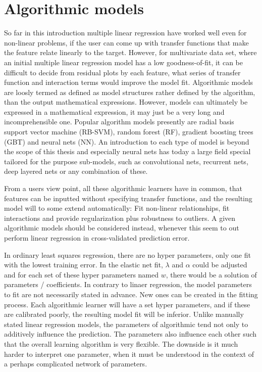\section{Algorithmic models}
So far in this introduction multiple linear regression have worked well even for non-linear problems, if the user can come up with transfer functions that make the feature relate linearly to the target. However, for multivariate data set, where an initial multiple linear regression model has a low goodness-of-fit, it can be difficult to decide from residual plots by each feature, what series of transfer function and interaction terms would improve the model fit. Algorithmic models are loosly termed as defined as model structures rather defined by the algorithm, than the output mathematical expressions. However, models can ultimately be expressed in a mathematical expression, it may just be a very long and incomprehensible one. Popular algorithm models presently are radial basis support vector machine (RB-SVM), random forest (RF), gradient boosting trees (GBT) and neural nets (NN). An introduction to each type of model is beyond the scope of this thesis and especially neural nets has today a large field special tailored for the purpose sub-models, such as convolutional nets, recurrent nets, deep layered nets or any combination of these. 

From a users view point, all these algorithmic learners have in common, that features can be inputted without specifying transfer functions, and the resulting model will to some extend automatically: Fit non-linear relationships, fit interactions and provide regularization plus robustness to outliers. A given algorithmic models should be considered instead, whenever this seem to out perform linear regression in cross-validated prediction error.

In ordinary least squares regression, there are no hyper parameters, only one fit with the lowest training error. In the elastic net fit, $\lambda$ and $\alpha$ could be adjusted and for each set of these hyper parameters named $w$, there would be a solution of parameters / coefficients. In contrary to linaer regression, the model parameters to fit are not necessarily stated in advance. New ones can be created in the fitting process. Each algorithmic learner will have a set hyper parameters, and if these are calibrated poorly, the resulting model fit will be inferior. Unlike manually stated linear regression models, the parameters of algorithmic tend not only to additively influence the prediction. The parameters also influence each other such that the overall learning algorithm is very flexible. The downside is it much harder to interpret one parameter, when it must be understood in the context of a perhaps complicated network of parameters.

